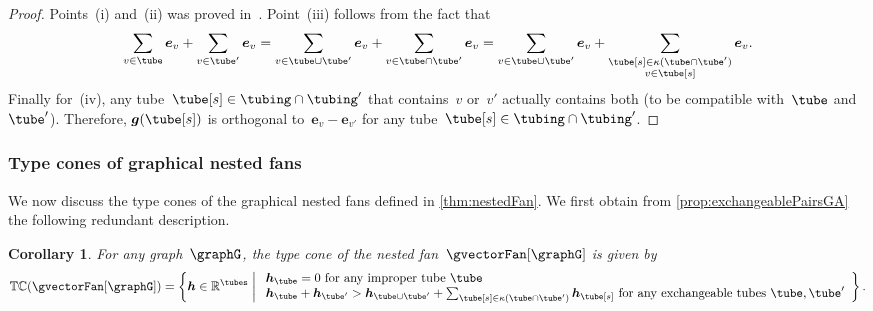 \documentclass{amsart}
\newtheorem{corollary}[theorem]{Corollary}
\theoremstyle{definition}
\newcommand{\R}{\mathbb{R}} %
\renewcommand{\b}[1]{{\boldsymbol{#1}}} %
\newcommand{\set}[2]{\left\{ #1 \;\middle|\; #2 \right\}} %
\newcommand{\gvector}[1]{\b{g}(#1)} %
\newcommand{\typeCone}{\mathbb{TC}} %
\newcommand{\connectedComponents}{\kappa} %
\begin{document}
\begin{proof}
Points~(i) and~(ii) was proved in~\cite{MannevillePilaud-compatibilityFans}. Point~(iii) follows from the fact that
\[
\sum_{v \in \tube} \b{e}_v + \sum_{v \in \tube'} \b{e}_v = \sum_{v \in \tube \cup \tube'} \b{e}_v + \sum_{v \in \tube \cap \tube'} \b{e}_v = \sum_{v \in \tube \cup \tube'} \b{e}_v + \sum_{\substack{\tube[s] \in \connectedComponents(\tube \cap \tube') \\ v \in \tube[s]}} \b{e}_v.
\]
Finally for~(iv), any tube~$\tube[s] \in \tubing \cap \tubing'$ that contains~$v$ or~$v'$ actually contains both (to be compatible with~$\tube$ and~$\tube'$). Therefore, $\gvector{\tube[s]}$ is orthogonal to~$\b{e}_v - \b{e}_{v'}$ for any tube~$\tube[s] \in \tubing \cap \tubing'$.
\end{proof}

\subsubsection{Type cones of graphical nested fans}

We now discuss the type cones of the graphical nested fans defined in \cref{thm:nestedFan}.
We first obtain from \cref{prop:exchangeablePairsGA} the following redundant description.

\begin{corollary}
For any graph~$\graphG$, the type cone of the nested fan~$\gvectorFan[\graphG]$ is given by
\[
\typeCone(\gvectorFan[\graphG]) = \set{\b{h} \in \R^{\tubes}}{\begin{array}{l} \b{h}_{\tube} = 0 \text{ for any improper tube } \tube \\ \b{h}_{\tube} + \b{h}_{\tube'} > \b{h}_{\tube \cup \tube'} + \sum_{\tube[s] \in \connectedComponents(\tube \cap \tube')} \b{h}_{\tube[s]} \text{ for any exchangeable tubes } \tube, \tube' \end{array}}.
\]
\end{corollary}
\end{document}
